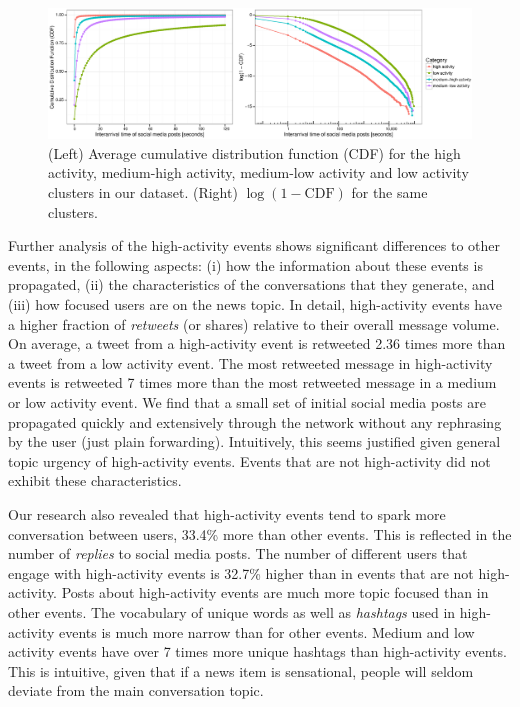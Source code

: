 \begin{figure}[!htb]
  \centering
 \includegraphics[width=\textwidth]{PLOSONE/figures/plots_revision/fig6_log}
  \caption[CDF for events from different categories]{{(Left) Average cumulative distribution function (CDF) for
the high activity, medium-high activity, medium-low activity and low activity clusters in our dataset.
(Right) $\log{(1 - \mathrm{CDF})}$ for the same clusters. 
    }}\label{fig:fig6} %
\end{figure}

Further analysis of the high-activity events shows significant
differences to other events, in the following aspects: (i) how the
information about these events is propagated, (ii) the characteristics
of the conversations that they generate, and (iii) how focused users
are on the news topic. In detail, high-activity events have a higher
fraction of {\em retweets} (or shares) relative to their overall
message volume. On average, a tweet from a high-activity event is
retweeted 2.36 times more than a tweet from a low activity event. The
most retweeted message in high-activity events is retweeted 7 times more
than the most retweeted message in a medium or low activity event. We
find that a small set of initial social media posts are propagated
quickly and extensively through the network without any rephrasing by
the user (just plain forwarding). Intuitively, this seems justified given
general topic urgency of high-activity events. Events that are not
high-activity did not exhibit these characteristics.

Our research also revealed that high-activity events tend to spark more conversation
between users, 33.4\% more than other events. This is reflected in the
number of {\em replies} to social media posts. The number of different
users that engage with high-activity events is 32.7\% higher than in
events that are not high-activity. Posts about high-activity events are
much more topic focused than in other events. The vocabulary of unique
words as well as {\em hashtags} used in high-activity events is much
more narrow than for other events. Medium and low activity events have
over 7 times more unique hashtags than high-activity events. This is
intuitive, given that if a news item is sensational, people will
seldom deviate from the main conversation topic.

